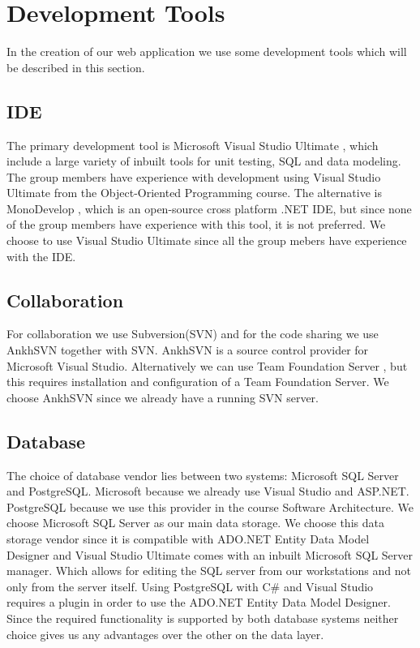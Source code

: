 \section{Development Tools}
In the creation of our web application we use some development tools which will be described in this section. 

\subsection{IDE}
\label{sub:ide}
The primary development tool is Microsoft Visual Studio Ultimate \cite{visualStudio}, which include a large variety of inbuilt tools for unit testing, SQL and data modeling. 
The group members have experience with development using Visual Studio Ultimate from the Object-Oriented Programming course. 
The alternative is MonoDevelop \cite{mono}, which is an open-source cross platform .NET IDE, but since none of the group members have experience with this tool, it is not preferred.
We choose to use Visual Studio Ultimate since all the group mebers have experience with the IDE.



\subsection{Collaboration}
\label{sub:collaboration}
For collaboration we use Subversion(SVN) and for the code sharing we use AnkhSVN \cite{ankhsvn} together with SVN. 
AnkhSVN is a source control provider for Microsoft Visual Studio. 
Alternatively we can use Team Foundation Server \cite{teamfoundation}, but this requires installation and configuration of a Team Foundation Server. 
We choose AnkhSVN since we already have a running SVN server. 

\subsection{Database}
\label{sub:database}
The choice of database vendor lies between two systems: Microsoft SQL Server and PostgreSQL. Microsoft because we already use Visual Studio and ASP.NET. PostgreSQL because we use this provider in the course Software Architecture. 
We choose Microsoft SQL Server as our main data storage.
We choose this data storage vendor since it is compatible with ADO.NET Entity Data Model Designer and Visual Studio Ultimate comes with an inbuilt Microsoft SQL Server manager. 
Which allows for editing the SQL server from our workstations and not only from the server itself. 
Using PostgreSQL with C\# and Visual Studio requires a plugin in order to use the ADO.NET Entity Data Model Designer. 
Since the required functionality is supported by both database systems neither choice gives us any advantages over the other on the data layer.